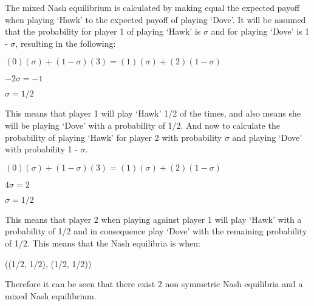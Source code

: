 The mixed Nash equilibrium is calculated by making equal the expected payoff  when playing `Hawk' to the expected payoff of playing `Dove'. It will be assumed that the probability for player 1 of playing `Hawk' is $\sigma$ and for playing `Dove' is 1 - $\sigma$, resulting in the following:
\begin{center}
$(0)(\sigma) + (1 - \sigma)(3) = (1)(\sigma) + (2)(1 - \sigma)$
\end{center}
\begin{center}
$-2 \sigma = -1$
\end{center}
\begin{center}
$\sigma = 1/2$
\end{center}
This means that player 1 will play `Hawk' 1/2 of the times, and also means she will be playing `Dove' with a probability of 1/2. And now to calculate the probability of playing `Hawk' for player 2 with probability $\sigma$ and playing `Dove' with probability 1 - $\sigma$.
\begin{center}
$(0)(\sigma) + (1 - \sigma)(3) = (1)(\sigma) + (2)(1 - \sigma)$
\end{center}
\begin{center}
$4 \sigma = 2$
\end{center}
\begin{center}
$\sigma = 1/2$
\end{center}

This means that player 2 when playing against player 1 will play `Hawk' with a probability of  1/2  and in consequence play `Dove' with the remaining probability of 1/2. 
This means that the Nash equilibria is when:
\begin{center}
((1/2, 1/2), (1/2, 1/2))
\end{center}
Therefore it can be seen that there exist 2 non symmetric Nash equilibria and a mixed Nash equilibrium.

